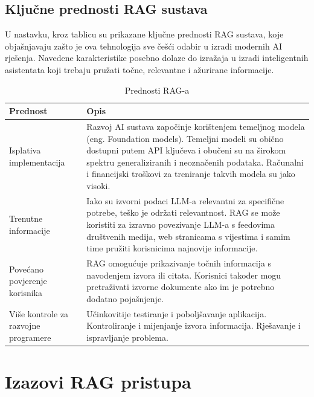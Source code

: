 \documentclass[]{foi}
\begin{document}
\subsection{Ključne prednosti RAG sustava}
U nastavku, kroz tablicu su prikazane ključne prednosti RAG sustava, koje objašnjavaju zašto je ova tehnologija sve češći odabir u izradi modernih AI rješenja. Navedene karakteristike
posebno dolaze do izražaja u izradi inteligentnih asistentata koji trebaju pružati točne, relevantne i ažurirane informacije. 

\begin{table}[ht!]
    \centering
    \caption{Prednosti RAG-a \cite{awsRAG2025}}
    \begin{tabular}{|>{\centering\arraybackslash}m{5cm}|>{\raggedright\arraybackslash}m{10cm}|}
      \hline
      \textbf{Prednost} & \textbf{Opis} \\
      \hline
      Isplativa implementacija & Razvoj AI sustava započinje korištenjem temeljnog modela (eng. Foundation models). Temeljni modeli su obično dostupni putem API ključeva i obučeni su na širokom spektru generaliziranih i neoznačenih podataka. Računalni i financijski troškovi za treniranje takvih modela su jako visoki. \\
      \hline
      Trenutne informacije & Iako su izvorni podaci LLM-a relevantni za specifične potrebe, teško je održati relevantnost. RAG se može koristiti za izravno povezivanje LLM-a s feedovima društvenih medija, web stranicama s vijestima i samim time pružiti korisnicima najnovije informacije. \\
      \hline
      Povećano povjerenje korisnika & RAG omogućuje prikazivanje točnih informacija s navođenjem izvora ili citata. Korisnici također mogu pretraživati izvorne dokumente ako im je potrebno dodatno pojašnjenje. \\
      \hline
      Više kontrole za razvojne programere & Učinkovitije testiranje i poboljšavanje aplikacija. Kontroliranje i mijenjanje izvora informacija. Rješavanje i ispravljanje problema. \\
      \hline
    \end{tabular}
\end{table}
    


\section{Izazovi RAG pristupa}
\end{document}
